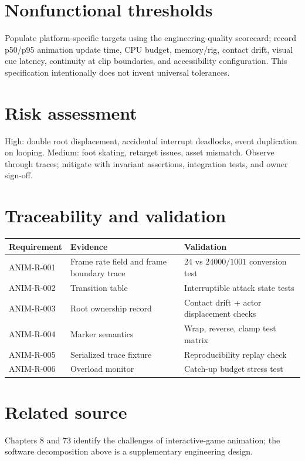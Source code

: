 \documentclass[10pt,letterpaper]{article}
\begin{document}
\section{Nonfunctional thresholds}
Populate platform-specific targets using the engineering-quality scorecard; record p50/p95 animation update time, CPU budget, memory/rig, contact drift, visual cue latency, continuity at clip boundaries, and accessibility configuration. This specification intentionally does not invent universal tolerances.
\section{Risk assessment}
High: double root displacement, accidental interrupt deadlocks, event duplication on looping. Medium: foot skating, retarget issues, asset mismatch. Observe through traces; mitigate with invariant assertions, integration tests, and owner sign-off.
\section{Traceability and validation}
\begin{tabular}{p{.21\linewidth}p{.33\linewidth}p{.3\linewidth}}
\textbf{Requirement}&\textbf{Evidence}&\textbf{Validation}\\\hline
ANIM-R-001&Frame rate field and frame boundary trace&24 vs $24000/1001$ conversion test\\
ANIM-R-002&Transition table&Interruptible attack state tests\\
ANIM-R-003&Root ownership record&Contact drift + actor displacement checks\\
ANIM-R-004&Marker semantics&Wrap, reverse, clamp test matrix\\
ANIM-R-005&Serialized trace fixture&Reproducibility replay check\\
ANIM-R-006&Overload monitor&Catch-up budget stress test\\
\end{tabular}
\section{Related source}
Chapters 8 and 73 identify the challenges of interactive-game animation; the software decomposition above is a supplementary engineering design.
\end{document}
